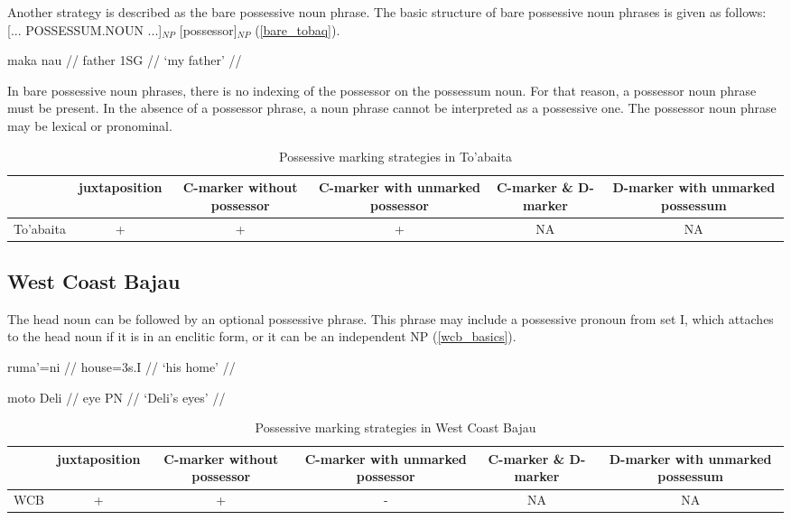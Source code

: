 Another strategy is described as the bare possessive noun phrase. The basic structure of bare possessive noun phrases is given as follows: [... POSSESSUM.NOUN ...]$_{NP}$ [possessor]$_{NP}$ (\ref{bare_tobaq}).

\ex\label{bare_tobaq}
\begingl
\gla maka nau //
\glb father 1SG //
\glft ‘my father’ //
\endgl
\xe

In bare possessive noun phrases, there is no indexing of the possessor on the possessum noun. For that reason, a possessor noun phrase must be present. In the absence of a possessor phrase, a noun phrase cannot be interpreted as a possessive one. The possessor noun phrase may be lexical or pronominal.


\begin{table}[h!]
	\centering
	\small
	\begin{tabular}{@{}cccccc@{}}
		\toprule
		& juxtaposition & \parbox{2.5cm}{C-marker without possessor} & \parbox{2.75cm}{C-marker with unmarked possessor} & \parbox{1.75cm}{C-marker \& D-marker} & \parbox{3cm}{D-marker with unmarked possessum} \\ \midrule
		To'abaita & + & + & + & NA & NA \\ \bottomrule
	\end{tabular}
	\caption{Possessive marking strategies in To'abaita}
\end{table}

\subsection{West Coast Bajau}

The head noun can be followed by an optional possessive phrase. This phrase may include a possessive pronoun from set I, which attaches to the head noun if it is in an enclitic form, or it can be an independent NP (\ref{wcb_basics}).

\pex\label{wcb_basics}
\a
\begingl
\gla ruma’=ni //
\glb house=3s.I //
\glft ‘his home’ //
\endgl

\a
\begingl
\gla moto Deli //
\glb eye PN //
\glft ‘Deli’s eyes’ //
\endgl
\xe

\begin{table}[h!]
	\centering
	\small
	\begin{tabular}{@{}cccccc@{}}
		\toprule
		& juxtaposition & \parbox{2.5cm}{C-marker without possessor} & \parbox{2.75cm}{C-marker with unmarked possessor} & \parbox{1.75cm}{C-marker \& D-marker} & \parbox{3cm}{D-marker with unmarked possessum} \\ \midrule
		WCB & + & + & - & NA & NA \\ \bottomrule
	\end{tabular}
	\caption{Possessive marking strategies in West Coast Bajau}
\end{table}

